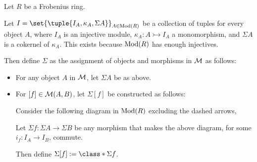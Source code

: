 \begin{definition}
    \label{def:stmod_sigma}
    Let \( R \) be a Frobenius ring.

    Let \( I = \set{\tuple{I_A, \kappa_A, \Sigma A}}_{A \in \Mod(R)} \) be a collection of tuples for every object \( A \), where \( I_A \) is an injective module, \( \kappa_A: A \rightarrowtail I_A \) a monomorphism, and \( \Sigma A \) is a cokernel of \( \kappa_A \). This exists because \( \operatorname{Mod}(R) \) has enough injectives.

    Then define \( \Sigma \) as the assignment of objects and morphisms in \( {\mathcal{M}} \) as follows:
    \begin{itemize}
        \item {
            For any object \( A \) in \( {\mathcal{M}} \), let \( \Sigma A \) be as above.
        }
        \item {
            For \( [f] \in {\mathcal{M}}(A, B) \), let \( \Sigma [f] \) be constructed as follows:

            Consider the following diagram in \( \operatorname{Mod}(R) \) excluding the dashed arrows,
            \begin{center}
            \end{center}

            Let \( \Sigma f: \Sigma A \to \Sigma B \) be any morphism that makes the above diagram, for some \( i_f: I_A \to I_B \), commute.

            Then define \( \Sigma [f] := \class*{\Sigma f} \).
        }
    \end{itemize}
\end{definition}

